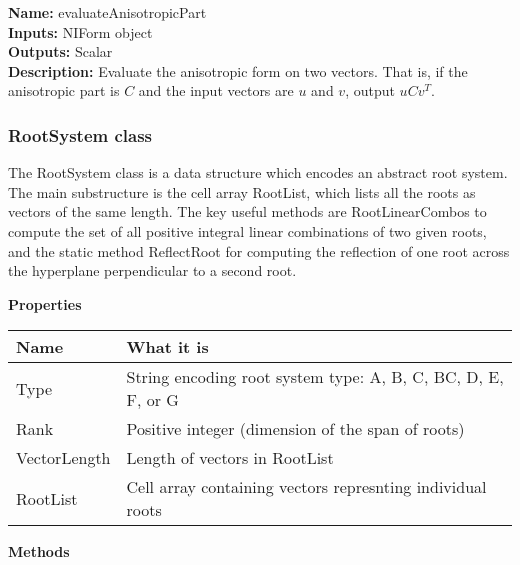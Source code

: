 \documentclass[12pt]{article}
\theoremstyle{definition}
\numberwithin{theorem}{subsection}
\newcommand{\tbf}{\textbf}
\newcommand{\noi}{\noindent}
\begin{document}
\begin{framed}
\noi \tbf{Name:} evaluateAnisotropicPart \\
\noi \tbf{Inputs:} NIForm object \\
\noi \tbf{Outputs:} Scalar \\
\noi \tbf{Description:} Evaluate the anisotropic form on two vectors. That is, if the anisotropic part is $C$ and the input vectors are $u$ and $v$, output $uCv^T$.
\end{framed}


\subsubsection{RootSystem class}

The RootSystem class is a data structure which encodes an abstract root system. The main substructure is the cell array RootList, which lists all the roots as vectors of the same length. The key useful methods are RootLinearCombos to compute the set of all positive integral linear combinations of two given roots, and the static method ReflectRoot for computing the reflection of one root across the hyperplane perpendicular to a second root.

\begin{center}
\tbf{Properties}
\end{center}

\begin{center}
	\begin{tabular}{l|l}
		Name & What it is \\
		\hline
		Type & String encoding root system type: A, B, C, BC, D, E, F, or G \\
		Rank & Positive integer (dimension of the span of roots) \\
		VectorLength & Length of vectors in RootList \\
		RootList & Cell array containing vectors represnting individual roots
	\end{tabular}
\end{center}

\begin{center}
\tbf{Methods}
\end{center}
\end{document}
